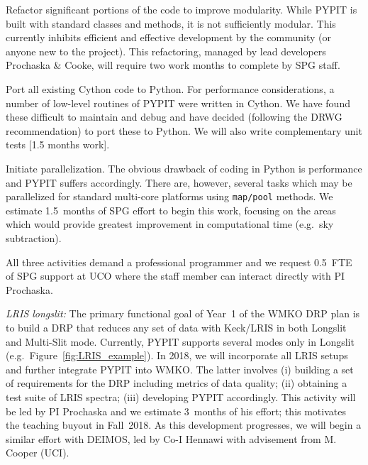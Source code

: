 \documentclass[12pt,preprint]{aastex}
\newenvironment{my_enumerate}{
\begin{enumerate}
  \setlength{\itemsep}{1pt}
  \setlength{\parskip}{0pt}
  \setlength{\parsep}{0pt}}{\end{enumerate}
}
\begin{document}
\vskip -0.15in

\begin{my_enumerate}

\vskip -0.15in

\item Refactor significant portions of the code to improve
modularity.  While PYPIT is built with standard classes 
and methods, it is not sufficiently modular.  This currently
inhibits efficient and effective development by the
community (or anyone new to the project).  This refactoring,
managed by lead developers Prochaska \& Cooke, 
will require two work months to complete by SPG staff.

\item Port all existing Cython code to Python.
For performance considerations, a number of low-level
routines of PYPIT were written in Cython.  We have
found these difficult to maintain and debug and have 
decided (following the DRWG recommendation) to port these
to Python.  We will also write complementary
unit tests [1.5 months work]. 

\item Initiate parallelization.  The obvious drawback
of coding in Python is performance and PYPIT suffers accordingly.
There are, however, several tasks which may be parallelized
for standard multi-core platforms using {\tt map/pool} methods.
We estimate 1.5~months of SPG effort to begin this work, 
focusing on the areas which would provide greatest 
improvement in computational time (e.g.\ sky subtraction). 
\end{my_enumerate}

\vskip -0.15in

\noindent
All three activities demand a professional programmer
and we request 0.5~FTE of SPG support at UCO where
the staff member can interact directly with PI Prochaska.


\noindent 
{\it LRIS longslit:} 
The primary functional goal of Year~1 of the WMKO
DRP plan is to build a DRP that reduces any set 
of data with Keck/LRIS in both Longslit and Multi-Slit mode.
Currently, PYPIT supports several modes only in Longslit
(e.g.\ Figure~\ref{fig:LRIS_example}).
In 2018, we will incorporate all LRIS setups
and further integrate PYPIT into WMKO. The latter
involves 
(i) building a set of requirements for the DRP 
including metrics of data quality;
(ii) obtaining a test suite of LRIS spectra;
(iii) developing PYPIT accordingly.
This activity will be led by PI Prochaska
and we estimate 3~months of his effort; this
motivates the teaching buyout in 
Fall~2018.  As this development progresses,
we will begin a similar effort with DEIMOS, led
by Co-I Hennawi with advisement 
from M. Cooper (UCI).
\end{document}
